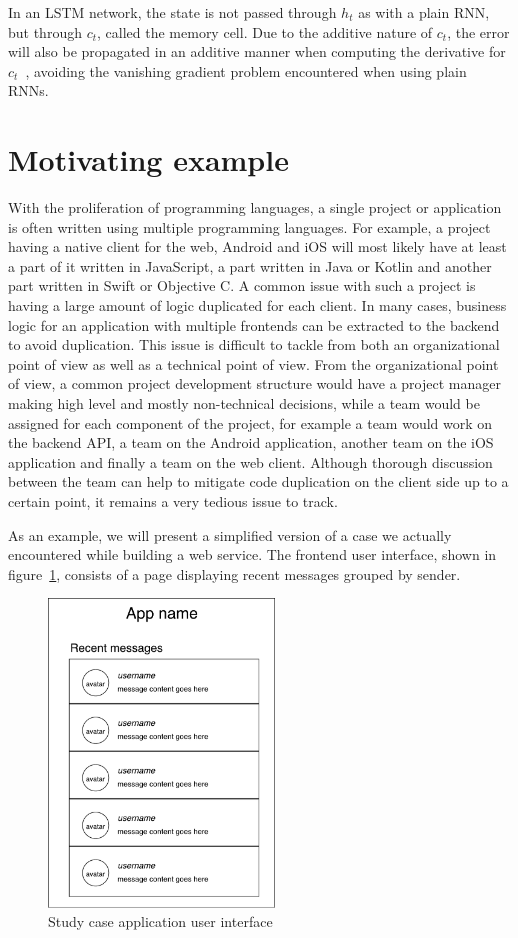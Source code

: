 In an LSTM network, the state is not passed through $h_t$ as with a plain RNN,
but through $c_t$, called the memory cell. Due to the additive nature of $c_t$,
the error will also be propagated in an additive manner when computing the
derivative for $c_t$~\cite{Hochreiter:1997:LSM:1246443.1246450}, avoiding the
vanishing gradient problem encountered when using plain RNNs.
%
\section{\label{sec:motivating-exmaple}Motivating example}
With the proliferation of programming languages, a single project or application
is often written using multiple programming languages. For example, a project
having a native client for the web, Android and iOS will most likely have at
least a part of it written in JavaScript, a part written in Java or Kotlin and
another part written in Swift or Objective C. A common issue with such a project
is having a large amount of logic duplicated for each client. In many cases,
business logic for an application with multiple frontends can be extracted to
the backend to avoid duplication. This issue is difficult to tackle from both an
organizational point of view as well as a technical point of view.
From the organizational point of view, a common project development structure
would have a project manager making high level and mostly non-technical
decisions, while a team would be assigned for each component of the project, for
example a team would work on the backend API, a team on the Android application,
another team on the iOS application and finally a team on the web client.
Although thorough discussion between the team can help to mitigate code
duplication on the client side up to a certain point, it remains a very tedious
issue to track.

As an example, we will present a simplified version of a case we actually
encountered while building a web service. The frontend user interface, shown in
figure~\ref{fig:app-messages-screen}, consists of a page displaying recent
messages grouped by sender.

\begin{figure}[tb]
  \centering\includegraphics[width=6cm]{./images/app-messages-screen.pdf}
  \caption{\label{fig:app-messages-screen} Study case application user interface}
\end{figure}

